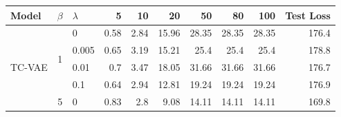 \begin{table}[htbp]
  \centering
    \begin{tabular}{|c|clrrrrrrr|}
    \toprule
    \multicolumn{1}{l}{\textbf{Model}} &
      \multicolumn{1}{l}{\textbf{$\beta$}} &
      \multicolumn{1}{l}{\textbf{$\lambda$}} &
      \textbf{5} &
      \textbf{10} &
      \textbf{20} &
      \textbf{50} &
      \textbf{80} &
      \textbf{100} &
      \multicolumn{1}{l}{\textbf{Test Loss}}
      \\
    \midrule
    \multirow{12}[6]{*}{TC-VAE} &
      \multirow{4}[2]{*}{1} &
      0 &
      \cellcolor[rgb]{ 1,  .937,  .612}0.58 &
      \cellcolor[rgb]{ .957,  .925,  .604}2.84 &
      \cellcolor[rgb]{ .698,  .843,  .549}15.96 &
      \cellcolor[rgb]{ .455,  .769,  .498}28.35 &
      \cellcolor[rgb]{ .455,  .769,  .498}28.35 &
      \cellcolor[rgb]{ .455,  .769,  .498}28.35 &
      176.4
      \\
     &
       &
      0.005 &
      \cellcolor[rgb]{ 1,  .937,  .612}0.65 &
      \cellcolor[rgb]{ .949,  .922,  .604}3.19 &
      \cellcolor[rgb]{ .714,  .847,  .553}15.21 &
      \cellcolor[rgb]{ .514,  .784,  .51}25.4 &
      \cellcolor[rgb]{ .514,  .784,  .51}25.4 &
      \cellcolor[rgb]{ .514,  .784,  .51}25.4 &
      \cellcolor[rgb]{ .608,  .761,  .902}178.8
      \\
     &
       &
      0.01 &
      \cellcolor[rgb]{ 1,  .937,  .612}0.7 &
      \cellcolor[rgb]{ .945,  .922,  .6}3.47 &
      \cellcolor[rgb]{ .659,  .831,  .541}18.05 &
      \cellcolor[rgb]{ .388,  .745,  .482}31.66 &
      \cellcolor[rgb]{ .388,  .745,  .482}31.66 &
      \cellcolor[rgb]{ .388,  .745,  .482}31.66 &
      \cellcolor[rgb]{ .953,  .973,  .988}176.7
      \\
     &
       &
      0.1 &
      \cellcolor[rgb]{ 1,  .937,  .612}0.64 &
      \cellcolor[rgb]{ .957,  .925,  .604}2.94 &
      \cellcolor[rgb]{ .761,  .863,  .565}12.81 &
      \cellcolor[rgb]{ .635,  .824,  .537}19.24 &
      \cellcolor[rgb]{ .635,  .824,  .537}19.24 &
      \cellcolor[rgb]{ .635,  .824,  .537}19.24 &
      \cellcolor[rgb]{ .922,  .953,  .98}176.9
      \\
\cmidrule{2-10}     &
      \multirow{4}[2]{*}{5} &
      0 &
      \cellcolor[rgb]{ 1,  .937,  .612}0.83 &
      \cellcolor[rgb]{ .945,  .922,  .6}2.8 &
      \cellcolor[rgb]{ .773,  .867,  .565}9.08 &
      \cellcolor[rgb]{ .631,  .824,  .537}14.11 &
      \cellcolor[rgb]{ .631,  .824,  .537}14.11 &
      \cellcolor[rgb]{ .631,  .824,  .537}14.11 &
      \cellcolor[rgb]{ .902,  .941,  .976}169.8

\end{tabular}
\end{table}
